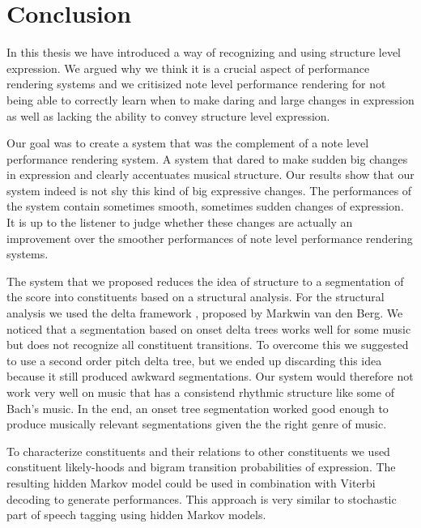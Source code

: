 \documentclass[a4paper,10pt]{article}
\begin{document}




\section{Conclusion}
\label{sec:conclusion}

In this thesis we have introduced a way of recognizing and using structure level expression. We argued why we think it is a crucial aspect of performance rendering systems and we critisized  note level performance rendering for not being able to correctly learn when to make daring and large changes in expression as well as lacking the ability to convey structure level expression. 

Our goal was to create a system that was the complement of a note level performance rendering system. A system that dared to make sudden big changes in expression and clearly accentuates musical structure. Our results show that our system indeed is not shy this kind of big expressive changes. The performances of the system contain sometimes smooth, sometimes sudden changes of expression. It is up to the listener to judge whether these changes are actually an improvement over the smoother performances of note level performance rendering systems.

The system that we proposed reduces the idea of structure to a segmentation of the score into constituents based on a structural analysis. For the structural analysis we used the delta framework \cite{markwin}, proposed by Markwin van den Berg. We noticed that a segmentation based on onset delta trees works well for some music but does not recognize all constituent transitions. To overcome this we suggested to use a second order pitch delta tree, but we ended up discarding this idea because it still produced awkward segmentations.  Our system would therefore not work very well on music that has a consistend rhythmic structure like some of Bach's music. In the end, an onset tree segmentation worked good enough to produce musically relevant segmentations given the the right genre of music.

To characterize constituents and their relations to other constituents we used constituent likely-hoods and bigram transition probabilities of expression. The resulting hidden Markov model could be used in combination with Viterbi decoding to generate performances. This approach is very similar to stochastic part of speech tagging using hidden Markov models.
\end{document}
